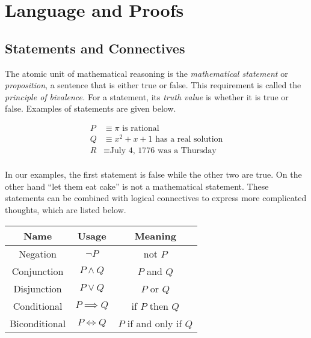 \chapter{Language and Proofs}

\section{Statements and Connectives}

The atomic unit of mathematical reasoning is the \emph{mathematical statement} or \emph{proposition}, a sentence that is either true or false. This requirement is called the \emph{principle of bivalence.} For a statement, its \emph{truth value} is whether it is true or false. Examples of statements are given below.

\begin{align*}
	P &\equiv \text{$\pi$ is rational} \\
	Q &\equiv \text{$x^2 + x + 1$ has a real solution} \\
	R &\equiv \text{July 4, 1776 was a Thursday} \\
\end{align*}
 
In our examples, the first statement is false while the other two are true. On the other hand ``let them eat cake'' is not a mathematical statement. These statements can be combined with logical connectives to express more complicated thoughts, which are listed below.

\vspace{\baselineskip}
\begin{center}
	\begin{tabular}{ccc}
		\toprule
		Name & Usage & Meaning \\
		\midrule
		Negation & $\neg P$ & not $P$ \\
		Conjunction & $P \wedge Q$ & $P$ and $Q$ \\
		Disjunction & $P \lor Q$ & $P$ or $Q$ \\
		Conditional & $P \implies Q$ & if $P$ then $Q$ \\
		Biconditional & $P \iff Q$ & $P$ if and only if $Q$ \\
		\bottomrule
	\end{tabular}
\end{center} 
\vspace{\baselineskip}

